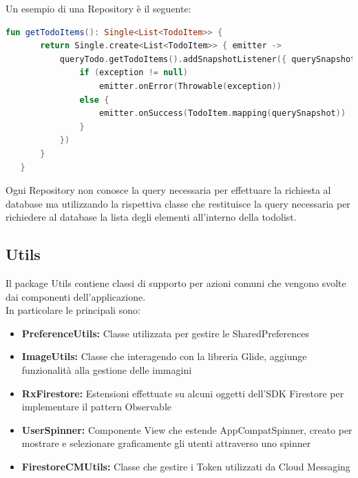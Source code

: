 Un esempio di una Repository è il seguente:

\begin{lstlisting}[language=kotlin,caption={Esempio RepositoryAggiunta elemento Todolist}]
fun getTodoItems(): Single<List<TodoItem>> {
       return Single.create<List<TodoItem>> { emitter ->
           queryTodo.getTodoItems().addSnapshotListener({ querySnapshot, exception ->
               if (exception != null)
                   emitter.onError(Throwable(exception))
               else {
                   emitter.onSuccess(TodoItem.mapping(querySnapshot))
               }
           })
       }
   }
\end{lstlisting}
Ogni Repository non conosce la query necessaria per effettuare la richiesta al database ma utilizzando la rispettiva classe che restituisce la query necessaria per richiedere al database la lista degli elementi all'interno della todolist.



\subsection{Utils}
Il package Utils contiene classi di supporto per azioni comuni che vengono svolte dai componenti dell'applicazione.\\
In particolare le principali sono:
\begin{itemize}
    \item \textbf{PreferenceUtils:} Classe utilizzata per gestire le SharedPreferences
    \item \textbf{ImageUtils:} Classe che interagendo con la libreria Glide, aggiunge funzionalità alla gestione delle immagini
    \item \textbf{RxFirestore:} Estensioni effettuate su alcuni oggetti dell'SDK Firestore per implementare il pattern Observable
    \item \textbf{UserSpinner:} Componente View che estende AppCompatSpinner, creato per mostrare e selezionare graficamente gli utenti attraverso uno spinner
    \item \textbf{FirestoreCMUtils:} Classe che gestire i Token utilizzati da Cloud Messaging
\end{itemize}

